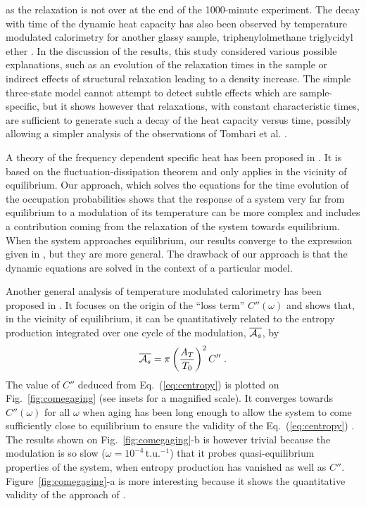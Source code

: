 \documentclass[pre,a4paper,twocolumn,superscriptaddress,%
floatfix]{revtex4}
\newcommand{\dtac}{\ensuremath{A_T}}
\begin{document}
as the relaxation is not over at the end of the 1000-minute experiment.
The decay with time of the dynamic heat capacity has also been observed by
temperature modulated calorimetry for another glassy sample,
triphenylolmethane triglycidyl ether
\cite{TOMBARI2002}. In the discussion of the results, this study considered
various possible explanations, such as an evolution of the relaxation times in
the sample or indirect effects of structural relaxation leading to a density
increase. The simple three-state model cannot attempt to detect subtle effects
which are sample-specific, but it shows however that relaxations, with
constant characteristic times, are sufficient to generate such a decay of the
heat capacity versus time, possibly allowing a simpler analysis of the
observations of Tombari et al. \cite{TOMBARI2002}.


\bigskip
A theory of the frequency dependent specific heat has been proposed in
\cite{NIELSEN}. It is based on the fluctuation-dissipation theorem and
only applies in the vicinity of equilibrium. Our approach, which solves the
equations for the time evolution of the occupation probabilities
shows that the response  of a system very far from equilibrium to a modulation
of its temperature can be more complex and includes a contribution coming from
the relaxation of the system towards equilibrium. When the system approaches
equilibrium, our results converge to the expression given in
\cite{NIELSEN}, but they are more general. The drawback of our approach
is that the dynamic equations are solved in the
context of a particular model.

\medskip
Another general analysis of temperature modulated calorimetry has been
proposed in 
\cite{GARDEN-RICHARD}. It focuses on the origin of the ``loss term''
$C''(\omega)$ and shows that, in the vicinity of equilibrium, it can be
quantitatively related to the entropy production integrated over one cycle of
the modulation, $\overline{{\cal A}_s}$, by
\begin{equation}
  \label{eq:centropy}
  \overline{{\cal A}_s} = \pi \left(\frac{\dtac}{T_0}\right)^2 C'' \; .
\end{equation}
The value of $C''$ deduced from Eq.~(\ref{eq:centropy}) is plotted on
Fig.~\ref{fig:comegaging} (see insets for a magnified scale).
It converges towards $C''(\omega)$ for all
$\omega$ when aging has been long enough to allow the system to come
sufficiently close to equilibrium to ensure the validity of the
Eq.~(\ref{eq:centropy}) \cite{GARDEN-RICHARD}. The results shown on
Fig.~\ref{fig:comegaging}-b is however trivial because the modulation is so slow
($\omega = 10^{-4}\,$t.u.$^{-1}$) that it probes quasi-equilibrium properties
of the system, when entropy production has vanished as well as $C''$.
Figure~\ref{fig:comegaging}-a is more interesting because it shows the
quantitative validity of the approach of \cite{GARDEN-RICHARD}.
\end{document}
